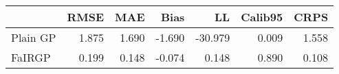 \begin{tabular}{lrrrrrr}
\toprule
{} &   RMSE &    MAE &   Bias &      LL &  Calib95 &   CRPS \\
\midrule
Plain GP &  1.875 &  1.690 & -1.690 & -30.979 &    0.009 &  1.558 \\
FaIRGP   &  0.199 &  0.148 & -0.074 &   0.148 &    0.890 &  0.108 \\
\bottomrule
\end{tabular}
